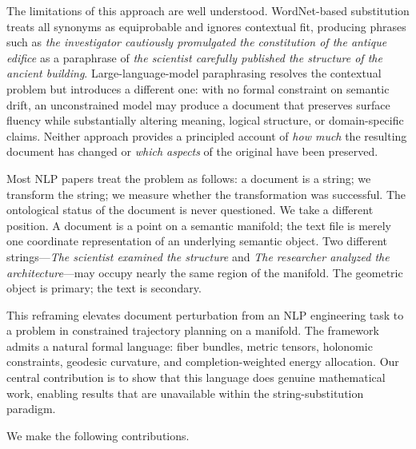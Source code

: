 \documentclass[12pt, a4paper]{article}
\theoremstyle{plain}
\theoremstyle{definition}
\theoremstyle{remark}
\begin{document}
The limitations of this approach are well understood.  WordNet-based substitution
\cite{miller1995wordnet} treats all synonyms as equiprobable and ignores
contextual fit, producing phrases such as \emph{the investigator cautiously
promulgated the constitution of the antique edifice} as a paraphrase of
\emph{the scientist carefully published the structure of the ancient building}.
Large-language-model paraphrasing \cite{brown2020gpt3} resolves the contextual
problem but introduces a different one: with no formal constraint on semantic
drift, an unconstrained model may produce a document that preserves surface
fluency while substantially altering meaning, logical structure, or
domain-specific claims.  Neither approach provides a principled account of
\emph{how much} the resulting document has changed or \emph{which aspects} of
the original have been preserved.

Most NLP papers treat the problem as follows: a document is a string; we
transform the string; we measure whether the transformation was successful.
The ontological status of the document is never questioned.  We take a
different position.  A document is a point on a semantic manifold; the text
file is merely one coordinate representation of an underlying semantic object.
Two different strings---\emph{The scientist examined the structure} and
\emph{The researcher analyzed the architecture}---may occupy nearly the same
region of the manifold.  The geometric object is primary; the text is secondary.

This reframing elevates document perturbation from an NLP engineering task to a
problem in constrained trajectory planning on a manifold.  The framework admits
a natural formal language: fiber bundles, metric tensors, holonomic constraints,
geodesic curvature, and completion-weighted energy allocation.  Our central
contribution is to show that this language does genuine mathematical work,
enabling results that are unavailable within the string-substitution paradigm.

We make the following contributions.
\end{document}
